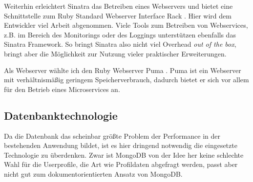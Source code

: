 Weiterhin erleichtert Sinatra das Betreiben eines Webservers und bietet eine Schnittstelle zum Ruby Standard Webserver Interface Rack \cite{rack}. Hier wird dem Entwickler viel Arbeit abgenommen. Viele Tools zum Betreiben von Webservices, z.B. im Bereich des Monitorings oder des Loggings unterstützen ebenfalls das Sinatra Framework. So bringt Sinatra also nicht viel Overhead \textit{out of the box}, bringt aber die Möglichkeit zur Nutzung vieler praktischer Erweiterungen.

Als Webserver wählte ich den Ruby Webserver Puma \cite{puma}. Puma ist ein Webserver mit verhältnismäßig geringem Speicherverbrauch, dadurch bietet er sich vor allem für den Betrieb eines Microservices an.
\subsection{Datenbanktechnologie}
Da die Datenbank das scheinbar größte Problem der Performance in der bestehenden Anwendung bildet, ist es hier dringend notwendig die eingesetzte Technologie zu überdenken. 
Zwar ist MongoDB von der Idee her keine schlechte Wahl für die Userprofile, die Art wie Profildaten abgefragt werden, passt aber nicht gut zum dokumentorientierten Ansatz von MongoDB.

